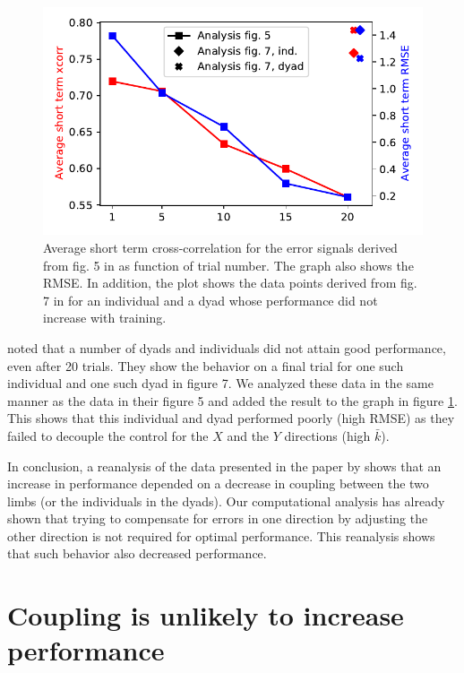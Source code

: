 \documentclass[11pt]{article}
\begin{document}
\begin{figure}
	\centering
	\includegraphics[width=1\linewidth]{reanalysis}
	\caption{Average short term cross-correlation for the error signals derived from fig. 5 in \citet{Annand2020} as function of trial number. The graph also shows the RMSE. In addition, the plot shows the data points derived from fig. 7 in \citet{Annand2020} for an individual and a dyad whose performance did not increase with training.}
	\label{fig:reanalysis}
\end{figure}

\citet{Annand2020} noted that a number of dyads and individuals did not attain good performance, even after 20 trials. They show the behavior on a final trial for one such individual and one such dyad in figure 7. We analyzed these data in the same manner as the data in their figure 5 and added the result to the graph in figure \ref{fig:reanalysis}. This shows that this individual and dyad performed poorly (high RMSE) as they failed to decouple the control for the $X$ and the $Y$ directions (high $\bar{k}$).

In conclusion, a reanalysis of the data presented in the paper by \citet{Annand2020} shows that an increase in performance depended on a decrease in coupling between the two limbs (or the individuals in the dyads). Our computational analysis has already shown that trying to compensate for errors in one direction by adjusting the other direction is not required for optimal performance. This reanalysis shows that such behavior also decreased performance.

\section{Coupling is unlikely to increase performance}
\end{document}
